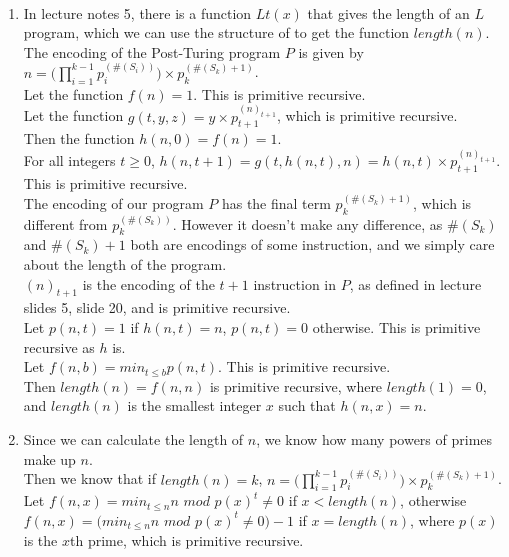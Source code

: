 \documentclass{assignment}
\begin{document}
\begin{problemlist}

  \pbitem
  \begin{problem}
  \end{problem}
  \begin{answer}
    \\
    \begin{enumerate}
    \item
      In lecture notes 5, there is a function $Lt(x)$ that gives the length of an $L$ program, which we can use the structure of to get the function $length(n)$.\\
      The encoding of the Post-Turing program $P$ is given by $n=\Big(\prod_{i=1}^{k-1}p_i^{(\#(S_i))}\Big)\times p_k^{(\#(S_k)+1)}$.\\
      Let the function $f(n)=1$. This is primitive recursive.\\
      Let the function $g(t,y,z)=y\times p_{t+1}^{(n)_{t+1}}$, which is primitive recursive.\\
      Then the function $h(n,0)=f(n)=1$.\\
      For all integers $t\ge 0$, $h(n,t+1)=g(t,h(n,t),n)=h(n,t)\times p_{t+1}^{(n)_{t+1}}$. This is primitive recursive.\\
      The encoding of our program $P$ has the final term $p_k^{(\#(S_k)+1)}$, which is different from $p_k^{(\#(S_k))}$. However it doesn't make any difference, as $\#(S_k)$ and $\#(S_k)+1$ both are encodings of some instruction, and we simply care about the length of the program.\\
      $(n)_{t+1}$ is the encoding of the $t+1$ instruction in $P$, as defined in lecture slides 5, slide 20, and is primitive recursive.\\
      Let $p(n,t)=1$ if $h(n,t)=n$, $p(n,t)=0$ otherwise. This is primitive recursive as $h$ is.\\
      Let $f(n,b)=min_{t\le b}p(n,t)$. This is primitive recursive.\\
      Then $length(n)=f(n,n)$ is primitive recursive, where $length(1)=0$, and $length(n)$ is the smallest integer $x$ such that $h(n,x)=n$.\\      
    \item
      Since we can calculate the length of $n$, we know how many powers of primes make up $n$.\\
      Then we know that if $length(n)=k$, $n=\Big(\prod_{i=1}^{k-1}p_i^{(\#(S_i))}\Big)\times p_k^{(\#(S_k)+1)}$.\\
      Let $f(n,x)=min_{t\le n} n$ $mod$ $p(x)^t \neq 0$ if $x < length(n)$, otherwise $f(n,x)=(min_{t\le n} n$ $mod$ $p(x)^t \neq 0)-1$ if $x=length(n)$, where $p(x)$ is the $x$th prime, which is primitive recursive.\\

\end{enumerate}
\end{answer}
\end{problemlist}
\end{document}
